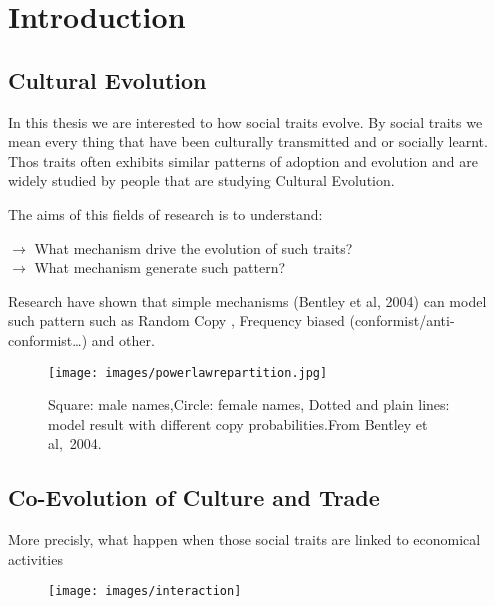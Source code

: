 \documentclass[a4paper]{article}
\begin{document}
\section*{Introduction}
\subsection*{Cultural Evolution}
In this thesis we are interested to how social traits evolve. By social traits we mean every thing that have been culturally transmitted and or socially learnt. Thos traits often exhibits similar patterns of adoption and evolution and are widely studied by people that are studying Cultural Evolution. 

The aims of this fields of research is to understand:\\

\begin{minipage}{\textwidth}
    $\rightarrow$ What mechanism drive the evolution of such traits?\\
    $\rightarrow$ What mechanism generate such pattern?
\end{minipage}
\vspace{2cm}

Research have shown that simple mechanisms (Bentley et al, 2004) can model such pattern such as Random Copy , Frequency biased (conformist/anti-conformist\dots) and other.

\begin{figure}
    \centering
    \texttt{[image: images/powerlawrepartition.jpg]}
    \caption{Square: male names,Circle: female names, Dotted and plain lines: model result with different copy probabilities.From Bentley et al,~2004.}

\end{figure}
\subsection*{Co-Evolution of Culture and Trade}
More precisly, what happen when those social traits are linked to economical activities

\begin{figure}
    \centering
    \texttt{[image: images/interaction]}	
\end{figure}
%
%
%
%
\end{document}
